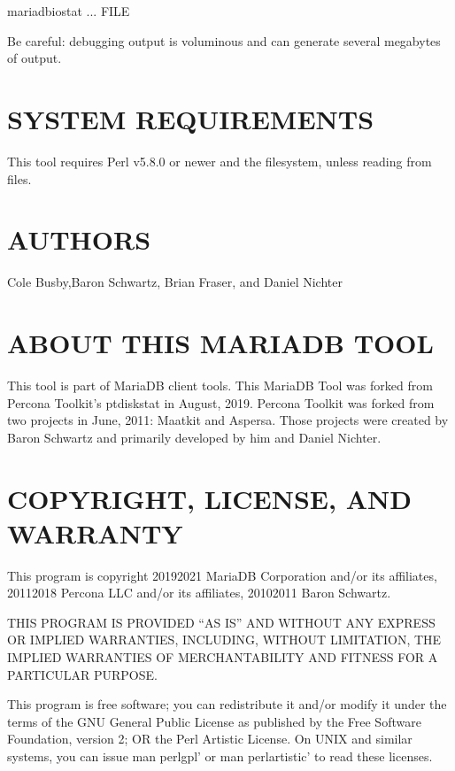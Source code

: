 \documentclass[letterpaper,10pt,english]{sphinxmanual}
\begin{document}
\begin{sphinxVerbatim}[commandchars=\\\{\}]
 mariadb\PYGZhy{}iostat ... \PYGZgt{} FILE \PYGZgt{}
\end{sphinxVerbatim}

Be careful: debugging output is voluminous and can generate several megabytes
of output.


\section{SYSTEM REQUIREMENTS}
\label{\detokenize{mariadb-iostat:system-requirements}}
This tool requires Perl v5.8.0 or newer and the  filesystem, unless
reading from files.


\section{AUTHORS}
\label{\detokenize{mariadb-iostat:authors}}
Cole Busby,Baron Schwartz, Brian Fraser, and Daniel Nichter


\section{ABOUT THIS MARIADB TOOL}
\label{\detokenize{mariadb-iostat:about-this-mariadb-tool}}
This tool is part of MariaDB client tools. This MariaDB Tool was forked from
Percona Toolkit’s pt\sphinxhyphen{}diskstat in August, 2019. Percona Toolkit was forked from two
projects in June, 2011: Maatkit and Aspersa.  Those projects were created by
Baron Schwartz and primarily developed by him and Daniel Nichter.


\section{COPYRIGHT, LICENSE, AND WARRANTY}
\label{\detokenize{mariadb-iostat:copyright-license-and-warranty}}
This program is copyright 2019\sphinxhyphen{}2021 MariaDB Corporation and/or its affiliates,
2011\sphinxhyphen{}2018 Percona LLC and/or its affiliates, 2010\sphinxhyphen{}2011 Baron Schwartz.

THIS PROGRAM IS PROVIDED “AS IS” AND WITHOUT ANY EXPRESS OR IMPLIED
WARRANTIES, INCLUDING, WITHOUT LIMITATION, THE IMPLIED WARRANTIES OF
MERCHANTABILITY AND FITNESS FOR A PARTICULAR PURPOSE.

This program is free software; you can redistribute it and/or modify it under
the terms of the GNU General Public License as published by the Free Software
Foundation, version 2; OR the Perl Artistic License.  On UNIX and similar
systems, you can issue \textasciigrave{}man perlgpl’ or \textasciigrave{}man perlartistic’ to read these
licenses.
\end{document}
